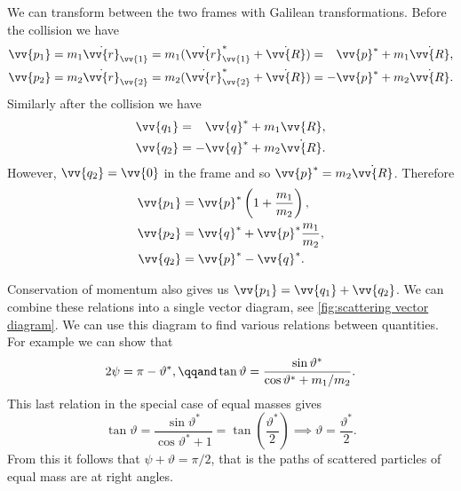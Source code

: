     We can transform between the two frames with Galilean transformations.
    Before the collision we have
    \begin{gather}
        \vv{p_1} = m_1\dot{\vv{r}}_{\vv{1}} = m_1(\dot{\vv{r}}_{\vv{1}}^* + \dot{\vv{R}}) = \hphantom{-} \vv{p}^* + m_1\dot{\vv{R}},\\
        \vv{p_2} = m_2\dot{\vv{r}}_{\vv{2}} = m_2(\dot{\vv{r}}_{\vv{2}}^* + \dot{\vv{R}}) = - \vv{p}^* + m_2\dot{\vv{R}}.
    \end{gather}
    Similarly after the collision we have
    \begin{gather}
        \vv{q_1} = \hphantom{-}\vv{q}^* + m_1\vv{R},\\
        \vv{q_2} = -\vv{q}^* + m_2\dot{\vv{R}}.
    \end{gather}
    However, \(\vv{q_2} = \vv{0}\) in the \LAB{} frame and so \(\vv{p}^* = m_2\dot{\vv{R}}\).
    Therefore
    \begin{align}
        \vv{p_1} &= \vv{p}^*\left( 1 + \frac{m_1}{m_2} \right),\\
        \vv{p_2} &= \vv{q}^* + \vv{p}^* \frac{m_1}{m_2},\\
        \vv{q_2} &= \vv{p}^* - \vv{q}^*.
    \end{align}
    
    Conservation of momentum also gives us \(\vv{p_1} = \vv{q_1} + \vv{q_2}\).
    We can combine these relations into a single vector diagram, see \cref{fig:scattering vector diagram}.
    We can use this diagram to find various relations between quantities.
    For example we can show that
    \begin{equation}
        2\psi = \pi - \vartheta^*, \qqand \tan\vartheta = \frac{\sin\vartheta^*}{\cos\vartheta^* + m_1/m_2}.
    \end{equation}
    This last relation in the special case of equal masses gives
    \begin{equation}
        \tan\vartheta = \frac{\sin\vartheta^*}{\cos\vartheta^* + 1} = \tan\left( \frac{\vartheta^*}{2} \right) \implies \vartheta = \frac{\vartheta^*}{2}.
    \end{equation}
    From this it follows that \(\psi + \vartheta = \pi/2\), that is the paths of scattered particles of equal mass are at right angles.
    
